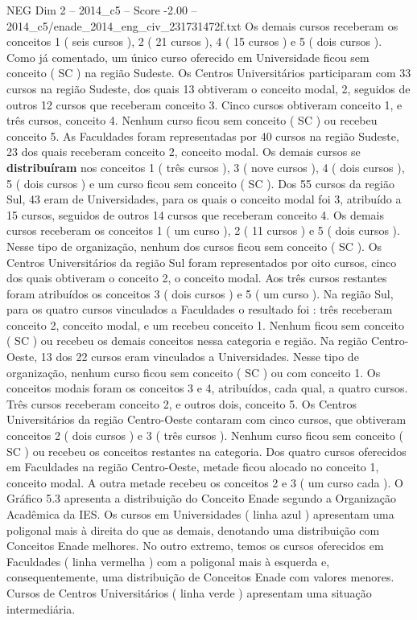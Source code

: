 \begin{textsample}{NEG Dim 2 – 2014\_c5 – Score -2.00 – 2014\_c5/enade\_2014\_eng\_civ\_231731472f.txt}
Os demais cursos receberam os conceitos 1 ( seis cursos ), 2 ( 21 cursos ), 4 ( 15 cursos ) e 5 ( dois cursos ).
Como já comentado, um único curso oferecido em Universidade ficou sem conceito ( SC ) na região Sudeste.
Os Centros Universitários participaram com 33 cursos na região Sudeste, dos quais 13 obtiveram o conceito modal, 2, seguidos de outros 12 cursos que receberam conceito 3.
Cinco cursos obtiveram conceito 1, e três cursos, conceito 4.
Nenhum curso ficou sem conceito ( SC ) ou recebeu conceito 5.
As Faculdades foram representadas por 40 cursos na região Sudeste, 23 dos quais receberam conceito 2, conceito modal.
Os demais cursos se \textbf{distribuíram} nos conceitos 1 ( três cursos ), 3 ( nove cursos ), 4 ( dois cursos ), 5 ( dois cursos ) e um curso ficou sem conceito ( SC ).
Dos 55 cursos da região Sul, 43 eram de Universidades, para os quais o conceito modal foi 3, atribuído a 15 cursos, seguidos de outros 14 cursos que receberam conceito 4.
Os demais cursos receberam os conceitos 1 ( um curso ), 2 ( 11 cursos ) e 5 ( dois cursos ).
Nesse tipo de organização, nenhum dos cursos ficou sem conceito ( SC ).
Os Centros Universitários da região Sul foram representados por oito cursos, cinco dos quais obtiveram o conceito 2, o conceito modal.
Aos três cursos restantes foram atribuídos os conceitos 3 ( dois cursos ) e 5 ( um curso ).
Na região Sul, para os quatro cursos vinculados a Faculdades o resultado foi : três receberam conceito 2, conceito modal, e um recebeu conceito 1.
Nenhum ficou sem conceito ( SC ) ou recebeu os demais conceitos nessa categoria e região.
Na região Centro-Oeste, 13 dos 22 cursos eram vinculados a Universidades.
Nesse tipo de organização, nenhum curso ficou sem conceito ( SC ) ou com conceito 1.
Os conceitos modais foram os conceitos 3 e 4, atribuídos, cada qual, a quatro cursos.
Três cursos receberam conceito 2, e outros dois, conceito 5.
Os Centros Universitários da região Centro-Oeste contaram com cinco cursos, que obtiveram conceitos 2 ( dois cursos ) e 3 ( três cursos ).
Nenhum curso ficou sem conceito ( SC ) ou recebeu os conceitos restantes na categoria.
Dos quatro cursos oferecidos em Faculdades na região Centro-Oeste, metade ficou alocado no conceito 1, conceito modal.
A outra metade recebeu os conceitos 2 e 3 ( um curso cada ).
O Gráfico 5.3 apresenta a distribuição do Conceito Enade segundo a Organização Acadêmica da IES.
Os cursos em Universidades ( linha azul ) apresentam uma poligonal mais à direita do que as demais, denotando uma distribuição com Conceitos Enade melhores.
No outro extremo, temos os cursos oferecidos em Faculdades ( linha vermelha ) com a poligonal mais à esquerda e, consequentemente, uma distribuição de Conceitos Enade com valores menores.
Cursos de Centros Universitários ( linha verde ) apresentam uma situação intermediária.

\end{textsample}
